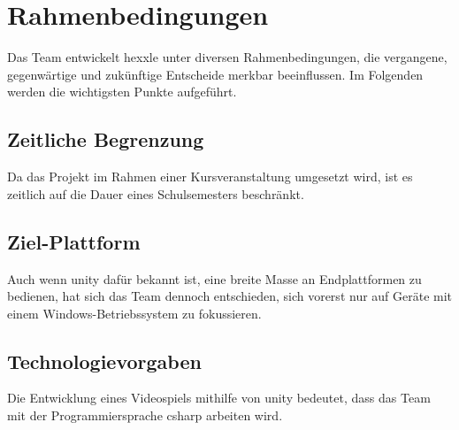 \documentclass[../main.tex]{subfiles}
\begin{document}
	\section{Rahmenbedingungen}
	\par Das Team entwickelt \gls{hexxle} unter diversen Rahmenbedingungen, die vergangene, gegenwärtige und zukünftige Entscheide merkbar beeinflussen. Im Folgenden werden die wichtigsten Punkte aufgeführt.
	
	\subsection{Zeitliche Begrenzung}
	\par Da das Projekt im Rahmen einer Kursveranstaltung umgesetzt wird, ist es zeitlich auf die Dauer eines Schulsemesters beschränkt.
	
	\subsection{Ziel-Plattform}
	\par Auch wenn \gls{unity} dafür bekannt ist, eine breite Masse an Endplattformen zu bedienen, hat sich das Team dennoch entschieden, sich vorerst nur auf Geräte mit einem Windows-Betriebssystem zu fokussieren.
	
	\subsection{Technologievorgaben}
	\par Die Entwicklung eines Videospiels mithilfe von \gls{unity} bedeutet, dass das Team mit der Programmiersprache \gls{csharp} arbeiten wird.
\end{document}
